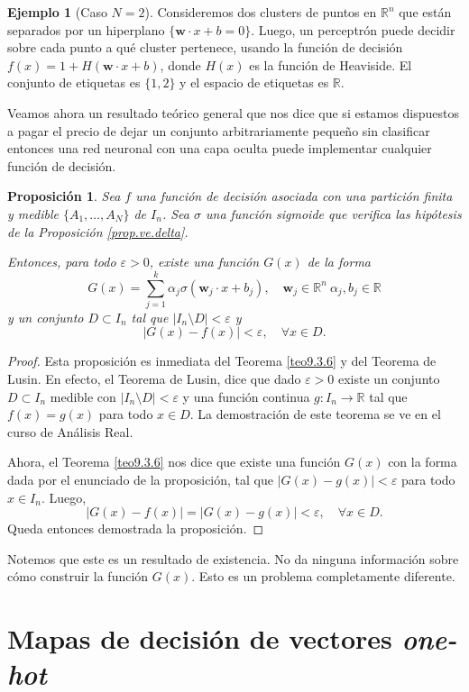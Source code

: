 \documentclass[12pt, a4paper]{amsbook}
\newcommand{\ve}{\varepsilon}
\newcommand{\R}{{\mathbb R}}
\newcommand{\ww}{{\mathbf w}}
\newtheorem{prop}[teo]{Proposici\'on}
\theoremstyle{remark}
\theoremstyle{definition}
\newtheorem{ejem}[teo]{Ejemplo}
\numberwithin{section}{chapter}
\numberwithin{subsection}{section}
\numberwithin{equation}{section}
\numberwithin{figure}{chapter}
\begin{document}
\begin{ejem}[Caso $N=2$]
Consideremos dos clusters de puntos en $\R^n$ que están separados por un hiperplano $\{\ww\cdot x+b=0\}$. Luego, un perceptrón puede decidir sobre cada punto a qué cluster pertenece, usando la función de decisión $f(x) = 1 + H(\ww\cdot x + b)$, donde $H(x)$ es la función de Heaviside. El conjunto de etiquetas es $\{1, 2\}$ y el espacio de etiquetas es $\R$.
\end{ejem}

Veamos ahora un resultado teórico general que nos dice que si estamos dispuestos a pagar el precio de dejar un conjunto arbitrariamente pequeño sin clasificar entonces una red neuronal con una capa oculta puede implementar cualquier función de decisión.

\begin{prop}
Sea $f$ una función de decisión asociada con una partición finita y medible $\{A_1,\dots, A_N\}$ de $I_n$. Sea $\sigma$ una función sigmoide que verifica las hipótesis de la Proposición \ref{prop.ve.delta}.

Entonces, para todo $\ve>0$, existe una función $G(x)$ de la forma 
$$
G(x) = \sum_{j=1}^k \alpha_j \sigma(\ww_j\cdot x + b_j),\quad \ww_j\in\R^n\ \alpha_j, b_j \in \R
$$
y un conjunto $D\subset I_n$ tal que $|I_n\setminus D|<\ve$ y 
$$
|G(x)-f(x)|<\ve,\quad \forall x\in D.
$$
\end{prop}

\begin{proof}
Esta proposición es inmediata del Teorema \ref{teo9.3.6} y del Teorema de Lusin. En efecto, el Teorema de Lusin, dice que dado $\ve>0$ existe un conjunto $D\subset I_n$ medible con $|I_n\setminus D|<\ve$ y una función continua $g\colon I_n\to\R$ tal que $f(x)=g(x)$ para todo $x\in D$. La demostración de este teorema se ve en el curso de Análisis Real.

Ahora, el Teorema \ref{teo9.3.6} nos dice que existe una función $G(x)$ con la forma dada por el enunciado de la proposición, tal que $|G(x)-g(x)|<\ve$ para todo $x\in I_n$. Luego,
$$
|G(x)-f(x)| = |G(x)-g(x)|<\ve,\quad \forall x\in D.
$$
Queda entonces demostrada la proposición.
\end{proof}

Notemos que este es un resultado de existencia. No da ninguna información sobre cómo construir la función $G(x)$. Esto es un problema completamente diferente.

\section{Mapas de decisión de vectores {\em one-hot}}\label{sec.c10.4}
\end{document}
